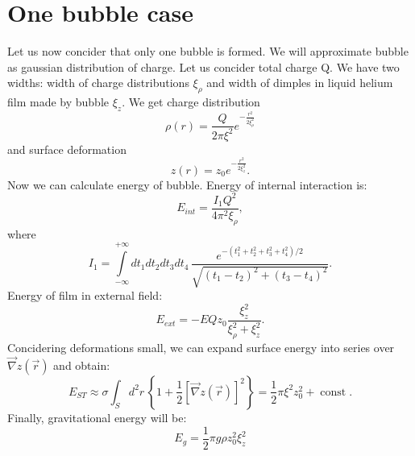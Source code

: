 \documentclass[10pt]{article}
\DeclareMathOperator{\const}{const}
\begin{document}
\section{One bubble case}
Let us now concider that only one bubble is formed.
We will approximate bubble as gaussian distribution of charge.
Let us concider total charge Q.
We have two widths: width of charge distributions $\xi_\rho$ and width of dimples in liquid helium film made by bubble $\xi_z$.
We get charge distribution
\begin{equation}
  \rho(r) = \frac{Q}{2 \pi \xi^2} e^{-\frac{r^2}{2 \xi_\rho^2}}
\end{equation}
and surface deformation
\begin{equation}
  z(r) = z_0 e^{-\frac{r^2}{2 \xi_z^2}}.
\end{equation}
Now we can calculate energy of bubble.
Energy of internal interaction is:
\begin{equation}
  E_{int} = \frac{I_1 Q^2}{4 \pi^2 \xi_\rho},
\end{equation}
where
\begin{equation}
  I_1 = \int\limits_{-\infty}^{+\infty} dt_1 dt_2 dt_3 dt_4 \, \frac{e^{-(t_1^2+t_2^2+t_3^2+t_4^2)/2}}{\sqrt{(t_1-t_2)^2+(t_3-t_4)^2}}.
\end{equation}
Energy of film in external field:
\begin{equation}
  E_{ext} = - E Q z_0 \frac{\xi_z^2}{\xi_\rho^2+\xi_z^2}.
\end{equation}
Concidering deformations small, we can expand surface energy into series over $\vec{\nabla} z(\vec{r})$ and obtain:
\begin{equation}
  E_{ST} \approx \sigma \int_S d^2r \, \left\{ 1 + \frac12 [\vec{\nabla} z(\vec{r})]^2 \right\} = \frac12 \pi \xi^2 z_0^2 + \const. 
\end{equation}
Finally, gravitational energy will be:
\begin{equation}
  E_g = \frac12 \pi g \rho z_0^2 \xi_z^2
\end{equation}
\end{document}
